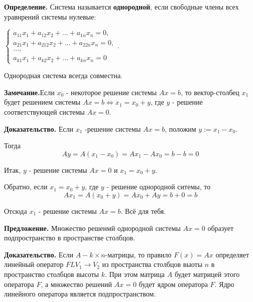 \documentclass[a4paper]{article}
\begin{document}
\newpage \begin{center}
                 \begin{Large}
                 \end{Large}
    \end{center}
    
   \textbf{Определение.} Система называется \textbf{однородной}, если свободные члены всех уравнрений системы нулевые:
   
$\begin{cases}
a_{11}x_1 + a_{12}x_2 + ... + a_{1n}x_n = 0,
\\
a_{21}x_1 + a_{212}x_2 + ... + a_{22n}x_n = 0,
\\
...,
\\
a_{k1}x_1 + a_{k2}x_2 + ... + a_{kn}x_n = 0

\end{cases}$.


Однородная система всегда совместна.

\begin{htheorem}
\textbf{Замечание.}Если $x_0$ - некоторое решение системы $Ax = b$, то вектор-столбец $x_1$ будет решением системы $Ax=b \Leftrightarrow x_1 = x_0 + y$, где $y$ - решение соответствующей системы $Ax = 0$.
\end{htheorem}

\begin{hproof}
\textbf{Доказательство.} Если $x_1$ -решение системы $Ax=b$, положим $y:=x_1-x_0$.

Тогда \begin{equation}
Ay = A(x_1-x_0) = Ax_1-Ax_0 = b-b=0
\end{equation}

Итак, $y$ - решение системы $Ax=0$ и $x_1=x_0+y$.

Обратно, если $x_1=x_0+y$, где $y$ - решение однородной ситемы, то \begin{equation}
Ax_1 = A(x_0+y) = Ax_0+Ay=b+0=b
\end{equation}

Отсюда $x_1$ - решение системы $Ax = b$. Всё для тебя.
\end{hproof}



\begin{htheorem}
\textbf{Предложение.} Множество решенмй однородной системы $Ax=0$ образует подпространство в пространстве столбцов.
\end{htheorem}

\begin{hproof}
\textbf{Доказательство.} Если $A - k \times n$-матрицы, то правило $F(x) = Ax$ определяет линейный оператор $FL V_1 \rightarrow V_2$ из пространства столбцов выоты $n$ в пространство столбцов высоты $k$. При этом матрица $A$ будет матрицей этого оператора $F$, а множество решений $Ax=0$ будет ядром оператора $F$. Ядро линейного оператора является подпространством.

\end{hproof}
\end{document}
